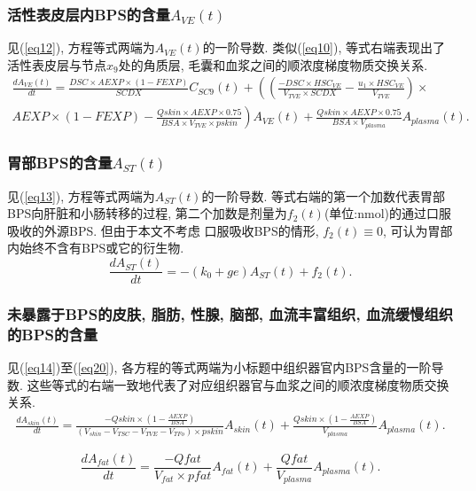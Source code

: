 \documentclass[a4paper,punct=banjiao,twoside]{ctexrep}
\theoremstyle{plain}
\theoremstyle{definition}
\theoremstyle{remark}
\begin{document}
\subsubsection*{活性表皮层内BPS的含量$A_{VE}(t)$}
见(\ref{eq12}), 方程等式两端为$A_{VE}(t)$的一阶导数. 类似(\ref{eq10}), 等式右端表现出了活性表皮层与节点$x_9$处的角质层, 毛囊和血浆之间的顺浓度梯度物质交换关系. 
\begin{multline}\label{eq12}
  \frac{dA_{VE}(t)}{dt}=\frac{DSC \times  AEXP \times  (1-FEXP)}{SCDX} C_{SC9}(t)+\left(\left(\frac{-DSC \times  HSC_{VE}}{V_{TVE}  \times  SCDX}-\frac{u_1  \times  HSC_{VE}}{V_{TVE} }\right)\times \right.\\ 
   \left.AEXP \times  (1-FEXP)-\frac{Qskin \times  AEXP \times  0.75}{BSA \times  V_{TVE}  \times  pskin}\right)A_{VE}(t)+\frac{Qskin \times  AEXP \times  0.75}{BSA \times  V_{plasma} } A_{plasma}(t).
\end{multline}

\subsubsection*{胃部BPS的含量$A_{ST}(t)$}
见(\ref{eq13}), 方程等式两端为$A_{ST}(t)$的一阶导数. 等式右端的第一个加数代表胃部BPS向肝脏和小肠转移的过程, 第二个加数是剂量为$f_2 (t)$(单位:nmol)的通过口服吸收的外源BPS. 但由于本文不考虑
口服吸收BPS的情形, $f_2 (t)\equiv 0$, 可认为胃部内始终不含有BPS或它的衍生物.
\begin{equation}\label{eq13}
  \frac{dA_{ST}(t)}{dt}=-(k_0+ge)A_{ST}(t)+f_2 (t).
\end{equation}
\subsubsection*{未暴露于BPS的皮肤, 脂肪, 性腺, 脑部, 血流丰富组织, 血流缓慢组织的BPS的含量}
见(\ref{eq14})至(\ref{eq20}), 各方程的等式两端为小标题中组织器官内BPS含量的一阶导数. 这些等式的右端一致地代表了对应组织器官与血浆之间的顺浓度梯度物质交换关系. 
\begin{multline}\label{eq14}
  \frac{dA_{skin}(t)}{dt}=\frac{-Qskin \times  (1-\frac{AEXP}{BSA})}{(V_{skin}-V_{TSC}-V_{TVE}-V_{TFo}) \times  pskin} A_{skin}(t)+\frac{Qskin \times  (1-\frac{AEXP}{BSA})}{V_{plasma}}  A_{plasma}(t).
\end{multline}

\begin{equation}\label{eq15}
  \frac{dA_{fat}(t)}{dt}=\frac{-Qfat}{V_{fat}  \times  pfat} A_{fat}(t)+\frac{Qfat}{V_{plasma}}  A_{plasma}(t).
\end{equation}
\end{document}

